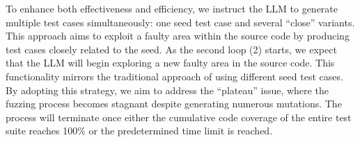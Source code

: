 To enhance both effectiveness and efficiency, we instruct the LLM to
generate multiple test cases simultaneously: one seed test case and
several ``close'' variants. This approach aims to exploit a
faulty area within the source code by producing test cases closely
related to the seed. As the second loop (2) starts, we
expect that the LLM will begin exploring a new faulty area in the
source code. This functionality mirrors the traditional approach of
using different seed test cases. By adopting this strategy, we aim to
address the ``plateau'' issue, where the fuzzing process becomes
stagnant despite generating numerous mutations. The process will
terminate once either the cumulative code coverage of the entire test
suite reaches 100\% or the predetermined time limit is reached.














